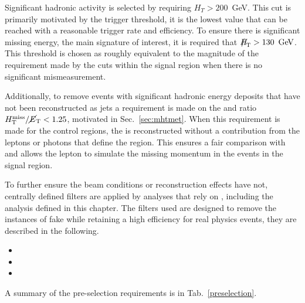 Significant hadronic activity is selected by requiring $H_T>200$~GeV.
This cut is primarily motivated by the trigger threshold, it is the
lowest \HT value that can be reached with a reasonable trigger rate
and efficiency. To ensure there is significant missing energy, the
main \BSM signature of interest, it is required that $\MHT>130~\gev$.
This threshold is chosen as roughly equivalent to the magnitude of the
\MET requirement made by the \alphat cuts within the signal region
when there is no significant mismeasurement. 

Additionally, to remove events with significant hadronic energy
deposits that have not been reconstructed as jets a requirement is
made on the \MHT and \MET ratio $\mbox{$\mbox{$H_{\rm T}^{\rm miss}$} / \mbox{$\cancel{E}_\text{T}$}$}<1.25$, motivated in
Sec.~\ref{sec:mhtmet}. When this requirement is made for the control
regions, the \MET is reconstructed without a contribution from the
leptons or photons that define the region. This ensures a fair
comparison with \MHT and allows the lepton to simulate the missing
momentum in the events in the signal region.

To further ensure the beam conditions or reconstruction effects have
not, centrally defined filters are applied by analyses that rely
on \MET, including the analysis defined in this chapter. The filters
used are designed to remove the instances of fake \MET while retaining
a high efficiency for real physics events, they are described in the
following.
\begin{itemize}
\item{}
\item{}
\item{}
\end{itemize}

A summary of the pre-selection requirements is in
Tab.~\ref{preselection}.

